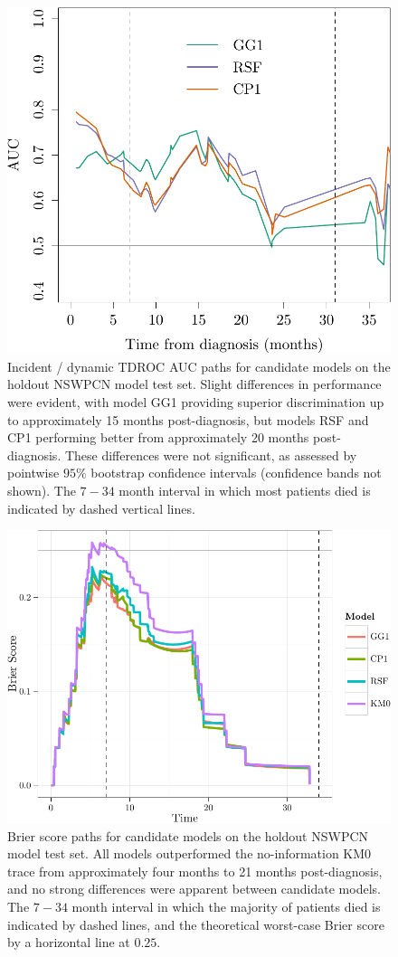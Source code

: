 \documentclass[dissertation.tex]{subfiles}
\begin{document}
\begin{figure}[!htbp]
\centering
  \includegraphics[width=.7\linewidth]{analysis/nomogram/figure/05-model-selection-roc-id-1}
  \caption[Time-dependent \texorpdfstring{\acrshort{AUC}}{AUC} paths for candidate models on holdout data]{Incident / dynamic \gls{TDROC} \gls{AUC} paths for candidate models on the holdout \gls{NSWPCN} model test set.  Slight differences in performance were evident, with model GG1 providing superior discrimination up to approximately 15 months post-diagnosis, but models RSF and CP1 performing better from approximately 20 months post-diagnosis.  These differences were not significant, as assessed by pointwise $95\%$ bootstrap confidence intervals (confidence bands not shown).  The $7-34$ month interval in which most patients died is indicated by dashed vertical lines.}
\label{fig:nomo-tdauc-paths}
\end{figure}

\begin{figure}[!htbp]
\centering
  \includegraphics[width=.7\linewidth]{analysis/nomogram/figure/05-model-selection-bs-paths-1}
  \caption[Brier score paths for candidate models on holdout data]{Brier score paths for candidate models on the holdout \gls{NSWPCN} model test set.  All models outperformed the no-information KM0 trace from approximately four months to 21 months post-diagnosis, and no strong differences were apparent between candidate models.  The $7-34$ month interval in which the majority of patients died is indicated by dashed lines, and the theoretical worst-case Brier score by a horizontal line at $0.25$.}
\label{fig:nomo-brier-paths}
\end{figure}
\end{document}
